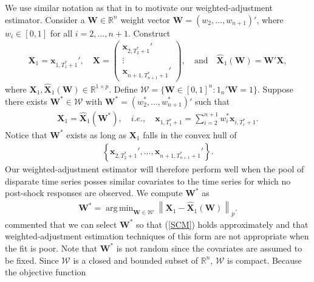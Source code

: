 \documentclass[11pt]{article}
\newcommand{\R}{\mathbb{R}}
\def\mbf#1{\mathbf{#1}} %
\newcommand{\reals}{\mathbb{R}} %
\def\mc#1{\mathcal{#1}} %
\DeclareMathOperator*{\argmin}{arg\,min} %
\newcommand{\norm}[1]{\left\lVert#1\right\rVert} %
\theoremstyle{definition}
\begin{document}
We use similar notation as that in \cite{abadie2010synthetic} to motivate our weighted-adjustment estimator. Consider a $\mbf{W} \in \R^n$ weight vector 
$\mbf{W}=(w_2, \ldots, w_{n+1})'$, where $w_i\in [0,1]$ for all 
$i = 2, \ldots, n+1$. Construct
\begin{align*}
 \mbf{X}_1 = \mbf{x}_{1, T_1^*+1}',
  \quad  
  \mbf{X} = \begin{pmatrix}
    \mbf{x}_{2, T_2^*+1}' \\
    \vdots \\
    \mbf{x}_{n+1, T_{n+1}^*+1}'
  \end{pmatrix},
  \quad \text{and} \quad 
  \hat{\mbf{X}}_1(\mbf{W}) 
    = \mbf{W}'\mbf{X},
\end{align*}
where $\mbf{X}_1,\hat{\mbf{X}}_1(\mbf{W}) \in \R^{1 \times p}$. Define $\mc{W}=\{\mbf{W}\in [0,1]^n \colon 1_n'\mbf{W} = 1 \}$. 
Suppose there exists $\mbf{W}^*\in \mc{W}$ with 
$\mbf{W}^*=(w_2^*, \ldots, w_{n+1}^*)'$ such that
\begin{align}
 \mbf{X}_1=\hat{\mbf{X}}_1(\mbf{W}^*),  \quad i.e., \quad \mbf{x}_{1, T_1^*+1} = \sum_{i=2}^{n+1} w_i^*\mbf{x}_{i, T_i^*+1}.\label{SCM}
\end{align}
 Notice that $\mbf{W}^*$ exists as long as $\mbf{X}_1$ falls in the convex hull of 
 \begin{align*}
   \left\{ \mbf{x}_{2, T_2^*+1}', \ldots, \mbf{x}_{n+1, T_{n+1}^*+1}' \right\}.
 \end{align*}
Our weighted-adjustment estimator will therefore perform well when the pool of 
disparate time series posses similar covariates to the time series for which 
no post-shock responses are observed. We compute $\mbf{W}^*$ as
\begin{align}
  \mbf{W}^* = \argmin_{\mbf{W}\in \mc{W}} \norm{\mbf{X}_1-\hat{\mbf{X}}_1(\mbf{W})}_{p}. 
  \label{W}
\end{align}
\cite{abadie2010synthetic} commented that we can select $\mbf{W}^*$ 
so that (\ref{SCM}) holds approximately %
and that weighted-adjustment estimation techniques of this form are not 
appropriate when the fit is poor. 
Note that $\mbf{W}^*$ is not random since the covariates are assumed to be fixed. Since $\mc{W}$ is a closed and bounded subset of $\reals^n$,  $\mc{W}$ is compact. Because the objective function 
\end{document}
